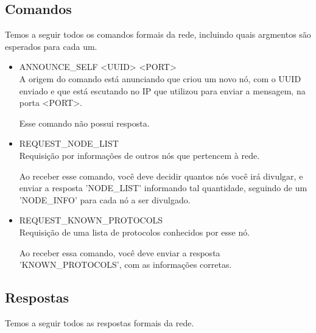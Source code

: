     \subsection{Comandos}
      Temos a seguir todos os comandos formais da rede, incluindo quais argmentos são esperados para cada um.
        
      \begin{itemize}
        \item ANNOUNCE\_SELF <UUID> <PORT> \\
          A origem do comando está anunciando que criou um novo nó, com o UUID enviado e que está escutando
          no IP que utilizou para enviar a mensagem, na porta <PORT>.
          
          Esse comando não possui resposta.
      
        \item REQUEST\_NODE\_LIST \\
          Requisição por informações de outros nós que pertencem à rede.
          
          Ao receber esse comando, você deve decidir quantos nós você irá divulgar, e enviar a resposta
          'NODE\_LIST' informando tal quantidade, seguindo de um 'NODE\_INFO' para cada nó a ser
          divulgado.
          
        \item REQUEST\_KNOWN\_PROTOCOLS \\
          Requisição de uma lista de protocolos conhecidos por esse nó.
          
          Ao receber essa comando, você deve enviar a resposta 'KNOWN\_PROTOCOLS', com as informações corretas.
          
      \end{itemize}
      
    \subsection{Respostas}
      Temos a seguir todos as respostas formais da rede.
      
